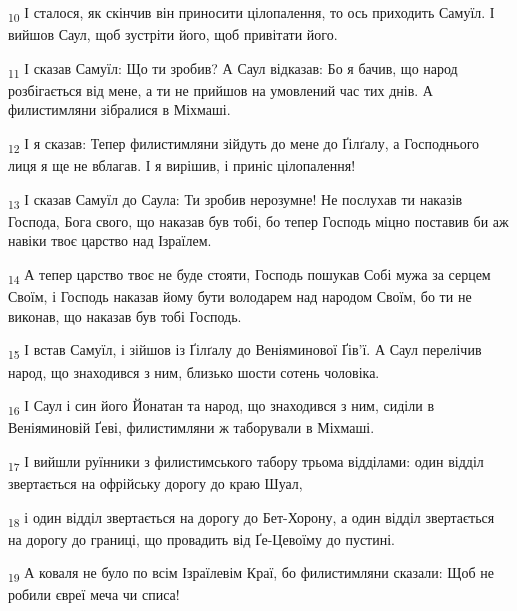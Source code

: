 \begin{tcolorbox}
\textsubscript{10} І сталося, як скінчив він приносити цілопалення, то ось приходить Самуїл. І вийшов Саул, щоб зустріти його, щоб привітати його.
\end{tcolorbox}
\begin{tcolorbox}
\textsubscript{11} І сказав Самуїл: Що ти зробив? А Саул відказав: Бо я бачив, що народ розбігається від мене, а ти не прийшов на умовлений час тих днів. А филистимляни зібралися в Міхмаші.
\end{tcolorbox}
\begin{tcolorbox}
\textsubscript{12} І я сказав: Тепер филистимляни зійдуть до мене до Ґілґалу, а Господнього лиця я ще не вблагав. І я вирішив, і приніс цілопалення!
\end{tcolorbox}
\begin{tcolorbox}
\textsubscript{13} І сказав Самуїл до Саула: Ти зробив нерозумне! Не послухав ти наказів Господа, Бога свого, що наказав був тобі, бо тепер Господь міцно поставив би аж навіки твоє царство над Ізраїлем.
\end{tcolorbox}
\begin{tcolorbox}
\textsubscript{14} А тепер царство твоє не буде стояти, Господь пошукав Собі мужа за серцем Своїм, і Господь наказав йому бути володарем над народом Своїм, бо ти не виконав, що наказав був тобі Господь.
\end{tcolorbox}
\begin{tcolorbox}
\textsubscript{15} І встав Самуїл, і зійшов із Ґілґалу до Веніяминової Ґів'ї. А Саул перелічив народ, що знаходився з ним, близько шости сотень чоловіка.
\end{tcolorbox}
\begin{tcolorbox}
\textsubscript{16} І Саул і син його Йонатан та народ, що знаходився з ним, сиділи в Веніяминовій Ґеві, филистимляни ж таборували в Міхмаші.
\end{tcolorbox}
\begin{tcolorbox}
\textsubscript{17} І вийшли руїнники з филистимського табору трьома відділами: один відділ звертається на офрійську дорогу до краю Шуал,
\end{tcolorbox}
\begin{tcolorbox}
\textsubscript{18} і один відділ звертається на дорогу до Бет-Хорону, а один відділ звертається на дорогу до границі, що провадить від Ґе-Цевоїму до пустині.
\end{tcolorbox}
\begin{tcolorbox}
\textsubscript{19} А коваля не було по всім Ізраїлевім Краї, бо филистимляни сказали: Щоб не робили євреї меча чи списа!
\end{tcolorbox}
